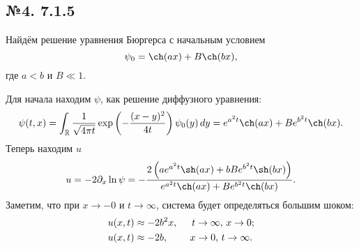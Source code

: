 \subsection*{№4. 7.1.5}

Найдём решение уравнения Бюргерса с начальным условием
\begin{equation*}
    \psi_0 = \ch(a x) + B \ch(bx),
\end{equation*}
где $a < b$ и $B \ll 1$.

Для начала находим $\psi$, как решение диффузного уравнения:
\begin{equation*}
    \psi(t, x) = \int_{\mathbb{R}} \frac{1}{\sqrt{4 \pi t}} \exp\left(
        - \frac{(x-y)^2}{4t}
    \right) \psi_0(y) \d  y = e^{a^2 t} \ch(a x) + B e^{b^2 t} \ch(bx).
\end{equation*}
Теперь находим $u$
\begin{equation*}
    u = -2 \partial_x \ln \psi = -\frac{2 \left(a e^{a^2 t} \sh (a x)+b B e^{b^2 t} \sh (b x)\right)}{e^{a^2 t} \ch (a x)+B e^{b^2 t} \ch (b x)}.
\end{equation*}
Заметим, что при $x \to -0$ и $t \to \infty$, система будет определяться большим шоком:
\begin{align*}
    u(x, t)  &\approx - 2 b^2 x, \hspace{5 mm} t \to \infty,\,  x \to 0; \\
    u(x, t)  &\approx - 2 b, \ \ \, \hspace{5 mm} x \to 0,\,  t \to \infty.\\
\end{align*}





